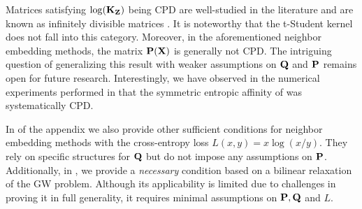 Matrices satisfying $\log({\mathbf{K}}_{\mathbf{Z}})$ being CPD are well-studied in the literature
and are known as infinitely divisible matrices \cite{bhatia2006infinitely}. It
is noteworthy that the t-Student kernel does not fall into this category.
Moreover,  in the aforementioned neighbor embedding methods, the matrix
${\mathbf{P}}({\mathbf{X}})$ is generally not CPD. The intriguing question of generalizing this
result with weaker assumptions on ${\mathbf{Q}}$ and ${\mathbf{P}}$ remains open for future
research. Interestingly, we have observed in the numerical experiments performed in  that the
symmetric entropic affinity of \citet{van2023snekhorn} was systematically CPD. 

\begin{remark}
In  of the appendix we also provide other sufficient conditions for neighbor embedding methods with the cross-entropy loss $L(x,y) = x \log(x/y)$. They rely on specific structures for ${\mathbf{Q}}$ but do not impose any assumptions on ${\mathbf{P}}$. Additionally, in , we provide a \emph{necessary} condition based on a bilinear relaxation of the GW problem. Although its applicability is limited due to challenges in proving it in full generality, it requires minimal assumptions on ${\mathbf{P}}, {\mathbf{Q}}$ and $L$.
\end{remark} 








